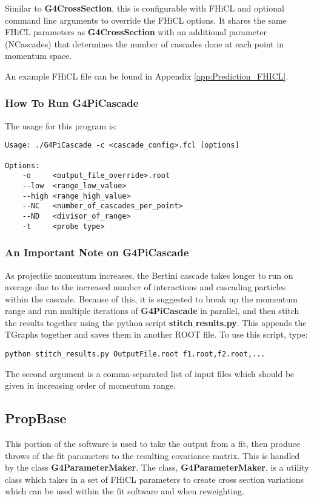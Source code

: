 \documentclass[12pt]{article}
\begin{document}
Similar to \textbf{G4CrossSection}, this is configurable with FHiCL and optional command line arguments to override the FHiCL options. It shares the same FHiCL parameters as \textbf{G4CrossSection} with an additional parameter (NCascades) that determines the number of cascades done at each point in momentum space. 

An example FHiCL file can be found in Appendix \ref{app:Prediction_FHICL}.

\subsubsection{How To Run G4PiCascade}
The usage for this program is: 

\begin{minipage}{\linewidth}
\begin{lstlisting}
Usage: ./G4PiCascade -c <cascade_config>.fcl [options]

Options: 
	-o     <output_file_override>.root
	--low  <range_low_value> 
	--high <range_high_value> 
	--NC   <number_of_cascades_per_point> 
	--ND   <divisor_of_range> 
	-t     <probe type> 
\end{lstlisting}
\end{minipage}

\subsubsection{An Important Note on G4PiCascade}\label{note:G4PiCascade}
As projectile momentum increases, the Bertini cascade takes longer to run on average due to the increased number of interactions and cascading particles within the cascade. Because of this, it is suggested to break up the momentum range and run multiple iterations of \textbf{G4PiCascade} in parallel, and then stitch the results together using the python script \textbf{stitch$\_$results.py}. This appends the TGraphs together and saves them in another ROOT file. To use this script, type:


\begin{minipage}{\linewidth}
\begin{lstlisting}
python stitch_results.py OutputFile.root f1.root,f2.root,...
\end{lstlisting}
\end{minipage}
The second argument is a comma-separated list of input files which should be given in increasing order of momentum range.
\subsection{PropBase}
This portion of the software is used to take the output from a fit, then produce throws of the fit parameters to the resulting covariance matrix. This is handled by the class \textbf{G4ParameterMaker}. The class, \textbf{G4ParameterMaker}, is a utility class which takes in a set of FHiCL parameters to create cross section variations which can be used within the fit software and when reweighting.
\end{document}
